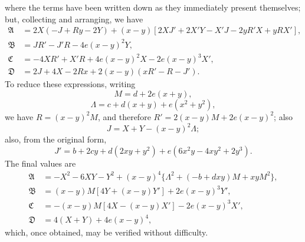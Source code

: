 \documentclass[11pt]{article}
\begin{document}
where the terms have been written down as they immediately present themselves; but, collecting and arranging, we have
\begin{align*}
\mathfrak{A} &= 2X(-J + Ry - 2Y) + (x - y)[2XJ' + 2X'Y - X'J - 2yR'X + yRX'],\\
\mathfrak{B} &= JR' - J'R - 4e(x - y)^2 Y,\\
\mathfrak{C} &= -4XR' + X'R + 4e(x - y)^2 X - 2e(x - y)^3 X',\\
\mathfrak{D} &= 2J + 4X - 2Rx + 2(x - y)(xR' - R - J').
\end{align*}
To reduce these expressions, writing
\[
M = d + 2e(x + y),
\]
\[
\Lambda = c + d(x + y) + e(x^2 + y^2),
\]
we have $R = (x - y)^2 M$, and therefore $R' = 2(x - y)M + 2e(x - y)^2$; also
\[
J = X + Y - (x - y)^2\Lambda;
\]
also, from the original form,
\[
J' = b + 2cy + d(2xy + y^2) + e(6x^2 y - 4xy^2 + 2y^3).
\]
The final values are
\begin{align*}
\mathfrak{A} &= -X^2 - 6XY - Y^2 + (x - y)^4\bigl\{\Lambda^2 + (-b + dxy)M + xyM^2\bigr\},\\
\mathfrak{B} &= (x - y)M[4Y + (x - y)Y'] + 2e(x - y)^3 Y',\\
\mathfrak{C} &= -(x - y)M[4X - (x - y)X'] - 2e(x - y)^3 X',\\
\mathfrak{D} &= 4(X + Y) + 4e(x - y)^4,
\end{align*}
which, once obtained, may be verified without difficulty.
\end{document}
